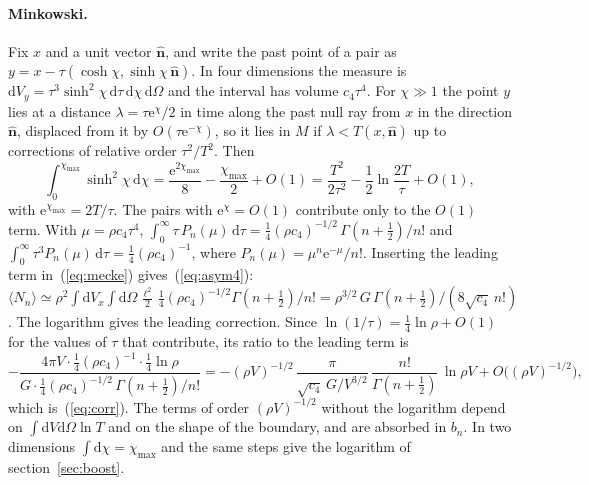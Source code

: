 \documentclass{iopjournal}
\newcommand{\eref}[1]{(\ref{#1})}
\newcommand{\rmd}{\mathrm{d}}
\newcommand{\rme}{\mathrm{e}}
\newcommand{\rhoV}{\rho V}
\begin{document}
\paragraph{Minkowski.} Fix $x$ and a unit vector $\hat{\boldsymbol n}$, and
write the past point of a pair as
$y=x-\tau(\cosh\chi,\sinh\chi\,\hat{\boldsymbol n})$. In four dimensions the
measure is $\rmd V_y=\tau^3\sinh^2\chi\,\rmd\tau\,\rmd\chi\,\rmd\Omega$ and the
interval has volume $c_4\tau^4$. For $\chi\gg1$ the point $y$ lies at a
distance $\lambda=\tau\rme^\chi/2$ in time along the past null ray from $x$ in
the direction $\hat{\boldsymbol n}$, displaced from it by $O(\tau\rme^{-\chi})$,
so it lies in $M$ if $\lambda<T(x,\hat{\boldsymbol n})$ up to corrections
of relative order $\tau^2/T^2$. Then
\begin{equation}
\int_0^{\chi_{\max}}\sinh^2\chi\,\rmd\chi=\frac{\rme^{2\chi_{\max}}}{8}
-\frac{\chi_{\max}}{2}+O(1)
=\frac{T^2}{2\tau^2}-\frac12\ln\frac{2T}{\tau}+O(1),
\end{equation}
with $\rme^{\chi_{\max}}=2T/\tau$. The pairs with $\rme^\chi=O(1)$
contribute only to the $O(1)$ term. With $\mu=\rho c_4\tau^4$,
$\int_0^\infty\tau\,P_n(\mu)\,\rmd\tau=\frac14(\rho c_4)^{-1/2}\,
\Gamma(n+\frac12)/n!$ and $\int_0^\infty\tau^3P_n(\mu)\,\rmd\tau=
\frac14(\rho c_4)^{-1}$, where $P_n(\mu)=\mu^n\rme^{-\mu}/n!$. Inserting the
leading term in~\eref{eq:mecke} gives~\eref{eq:asym4}:
$\langle N_n\rangle\simeq\rho^2\int\rmd V_x\int\rmd\Omega\,
\frac{\ell^2}{2}\,\frac14(\rho c_4)^{-1/2}\Gamma(n+\frac12)/n!
=\rho^{3/2}\,G\,\Gamma(n+\frac12)/(8\sqrt{c_4}\,n!)$. The logarithm gives the
leading correction. Since $\ln(1/\tau)=\frac14\ln\rho+O(1)$ for the values of
$\tau$ that contribute, its ratio to the leading term is
\begin{equation}
-\frac{4\pi V\cdot\frac14(\rho c_4)^{-1}\cdot\frac14\ln\rho}
{G\cdot\frac14(\rho c_4)^{-1/2}\,\Gamma(n+\frac12)/n!}
=-(\rhoV)^{-1/2}\,\frac{\pi}{\sqrt{c_4}\,G/V^{3/2}}\,\frac{n!}{\Gamma(n+\frac12)}\,
\ln\rhoV+O\big((\rhoV)^{-1/2}\big),
\end{equation}
which is~\eref{eq:corr}. The terms of order $(\rhoV)^{-1/2}$ without the
logarithm depend on $\int\rmd V\rmd\Omega\ln T$ and on the shape of the
boundary, and are absorbed in $b_n$. In two dimensions $\int\rmd\chi=
\chi_{\max}$ and the same steps give the logarithm of section~\ref{sec:boost}.
\end{document}
